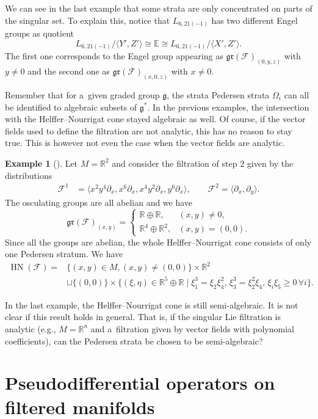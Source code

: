 \documentclass[pdftex]{sigma}
\newcommand{\R}{\mathbb R} %
\newcommand{\F}{\mathcal{F}} %
\newcommand{\g}{\mathfrak{g}} %
\newcommand{\lag}{\langle}
\newcommand{\rag}{\rangle}
\newcommand{\HN}{\operatorname{HN}} %
\newcommand{\Fb}{\mathcal{F}} %
\newcommand{\gr}{\mathfrak{gr}} %
\numberwithin{equation}{section}
\theoremstyle{definition}
\newtheorem{ex}[thm]{Example}
\begin{document}
We can see in the last example that some strata are only concentrated on parts of the singular set. To explain this, notice that $L_{6,21(-1)}$ has two different Engel groups as quotient
\[{L_{6,21(-1)}}/{\lag Y',Z'\rag} \cong \mathbb{E} \cong {L_{6,21(-1)}}/{\lag X',Z'\rag}.\]
The first one corresponds to the Engel group appearing as $\gr(\Fb)_{(0,y,z)}$ with $y\neq 0$ and the second one as $\gr(\Fb)_{(x,0,z)}$ with $x\neq 0$.

Remember that for a~given graded group $\g$, the strata Pedersen strata $\Omega_i$ can all be identified to algebraic subsets of $\g^*$. In the previous examples, the intersection with the Helffer--Nourrigat cone stayed algebraic as well. Of course, if the vector fields used to define the filtration are not analytic, this has no reason to stay true. This is however not even the case when the vector fields are analytic.

\begin{ex}[{\cite[Example 1.11.d]{AMYMaximalHypoellipticity}}]
 Let $M = \R^2$ and consider the filtration of step $2$ given by the distributions
 \begin{align*}
 \F^1 &= \bigl\lag x^2y^4\partial_x,x^6\partial_x, x^4y^2\partial_x, y^6\partial_x\bigr\rag,\qquad
 \F^2 = \lag \partial_x,\partial_y\rag.
 \end{align*}
 The osculating groups are all abelian and we have
 \[\gr(\Fb)_{(x,y)} = \begin{cases}
 \R \oplus \R,& (x,y)\neq 0,\\
 \R^4 \oplus \R^2,& (x,y)=(0,0).
 \end{cases}\]
 Since all the groups are abelian, the whole Helffer--Nourrigat cone consists of only one Pedersen stratum. We have
 \begin{align*}
 \HN(\Fb) ={}& \{(x,y)\in M, (x,y)\neq(0,0)\} \times \R^2 \\
 & \sqcup \{(0,0)\}\times \big\{(\xi,\eta)\in \R^5\oplus \R \mid \xi_1^3 = \xi_2\xi_4^2,\, \xi_3^3 = \xi_2^2\xi_4, \, \xi_i\xi_5\geq 0 \,\forall i\big\}.
 \end{align*}
\end{ex}

In the last example, the Helffer--Nourrigat cone is still semi-algebraic. It is not clear if this result holds in general. That is, if the singular Lie filtration is analytic (e.g., $M = \R^n$ and a~filtration given by vector fields with polynomial coefficients), can the Pedersen strata be chosen to be semi-algebraic?

\section{Pseudodifferential operators on filtered manifolds}\label{Section: Pseudos}
\end{document}
